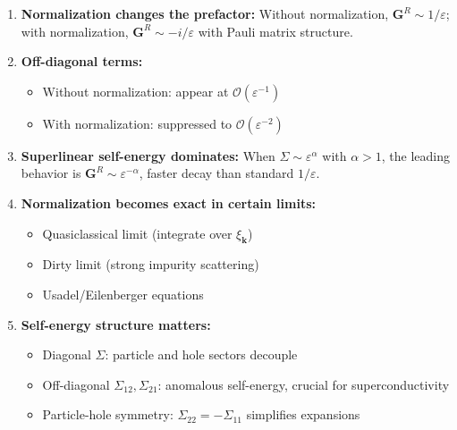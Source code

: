 \documentclass[12pt]{article}
\begin{document}
\begin{enumerate}
\item \textbf{Normalization changes the prefactor:} Without normalization, $\mathbf{G}^R \sim 1/\varepsilon$; with normalization, $\mathbf{G}^R \sim -i/\varepsilon$ with Pauli matrix structure.

\item \textbf{Off-diagonal terms:}
\begin{itemize}
\item Without normalization: appear at $\mathcal{O}(\varepsilon^{-1})$
\item With normalization: suppressed to $\mathcal{O}(\varepsilon^{-2})$
\end{itemize}

\item \textbf{Superlinear self-energy dominates:} When $\Sigma \sim \varepsilon^\alpha$ with $\alpha > 1$, the leading behavior is $\mathbf{G}^R \sim \varepsilon^{-\alpha}$, faster decay than standard $1/\varepsilon$.

\item \textbf{Normalization becomes exact in certain limits:}
\begin{itemize}
\item Quasiclassical limit (integrate over $\xi_{\mathbf{k}}$)
\item Dirty limit (strong impurity scattering)
\item Usadel/Eilenberger equations
\end{itemize}

\item \textbf{Self-energy structure matters:}
\begin{itemize}
\item Diagonal $\Sigma$: particle and hole sectors decouple
\item Off-diagonal $\Sigma_{12}, \Sigma_{21}$: anomalous self-energy, crucial for superconductivity
\item Particle-hole symmetry: $\Sigma_{22} = -\Sigma_{11}$ simplifies expansions
\end{itemize}
\end{enumerate}
\end{document}
